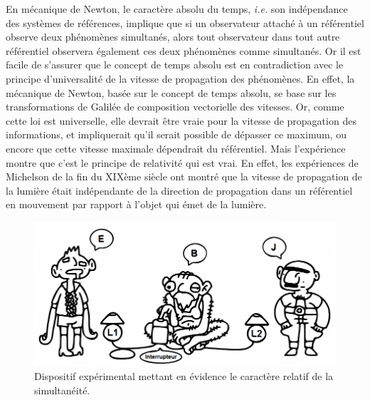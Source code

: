 		En mécanique de Newton, le caractère absolu du temps, \emph{i.e.} son indépendance des systèmes de références, implique que si un observateur attaché à un référentiel observe deux phénomènes simultanés, alors tout observateur dans tout autre référentiel observera également ces deux phénomènes comme simultanés. Or il est facile de s'assurer que le concept de temps absolu est en contradiction avec le principe d'universalité de la vitesse de propagation des phénomènes. En effet, la mécanique de Newton, basée sur le concept de temps absolu, se base sur les transformations de Galilée de composition vectorielle des vitesses. Or, comme cette loi est universelle, elle devrait être vraie pour la vitesse de propagation des informations, et impliquerait qu'il serait possible de dépasser ce maximum, ou encore que cette vitesse maximale dépendrait du référentiel. Mais l'expérience montre que c'est le principe de relativité qui est vrai. En effet, les expériences de Michelson de la fin du XIXème siècle ont montré que la vitesse de propagation de la lumière était indépendante de la direction de propagation dans un référentiel en mouvement par rapport à l'objet qui émet de la lumière. 

		\begin{figure}
			\centering
			\includegraphics[scale=0.5]{../cours/bb_by_eurydrama-d9uaffl.png}
			\caption{Dispositif expérimental mettant en évidence le caractère relatif de la simultanéité.}
			\label{pluthaar}
		\end{figure}

